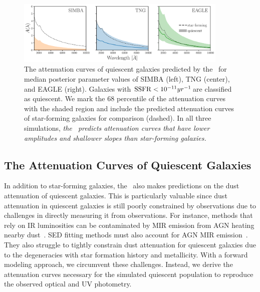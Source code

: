 \begin{figure}
\begin{center}
    \includegraphics[width=0.9\textwidth]{figs/abc_q_atten_unnorm.pdf}
    \caption{\label{fig:q_raw_atten}
    The attenuation curves of quiescent galaxies predicted by the \eda~for
    median posterior parameter values of SIMBA (left), TNG (center), and
    EAGLE (right).
    Galaxies with ${\rm SSFR} < 10^{-11}yr^{-1}$are classified as quiescent.
    We mark the 68 percentile of the attenuation curves with the shaded region
    and include the predicted attenuation curves of star-forming galaxies for
    comparison (dashed). 
    In all three simulations, \emph{the \eda~predicts attenuation curves that
    have lower amplitudes and shallower slopes than star-forming galaxies.}
    }
\end{center}
\end{figure}
\subsection{The Attenuation Curves of Quiescent Galaxies}  
In addition to star-forming galaxies, the \eda~also makes predictions on the
dust attenuation of quiescent galaxies. 
This is particularly valuable since dust attenuation in quiescent galaxies is
still poorly constrained by observations due to challenges in directly
measuring it from observations. 
For instance, methods that rely on IR luminosities can be contaminated by MIR
emission from AGN heating nearby dust~\citep{kirkpatrick2015}. 
SED fitting methods must also account for AGN MIR
emission~\citep{salim2016, leja2018, salim2018}. 
They also struggle to tightly constrain dust attenuation for quiescent galaxies
due to the degeneracies with star formation history and metallicity.
With a forward modeling approach, we circumvent these challenges. 
Instead, we derive the attenuation curves necessary for the simulated quiescent
population to reproduce the observed optical and UV photometry. 

